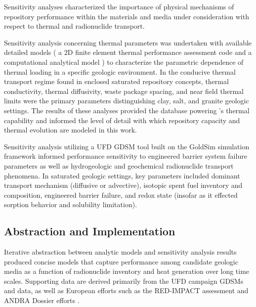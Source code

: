 Sensitivity analyses characterized the importance of physical mechanisms of 
repository performance  within the materials and media under consideration with 
respect to thermal and radionuclide transport.

Sensitivity analysis concerning thermal parameters was undertaken with available 
detailed models ( a 2D finite element thermal performance assessment code 
\cite{huff_benchmarking_2012, huff_numerical_2012} and a computational analytical model 
\cite{greenberg_application_2012}) to characterize the parametric dependence of 
thermal loading in a specific geologic environment.  In the conducive thermal 
transport regime found in enclosed saturated repository concepts, thermal 
conductivity, thermal diffusivity, waste package spacing, and near field thermal 
limits were the primary parameters distinguishing clay, salt, and granite 
geologic settings. The results of these analyses provided the database powering 
\Cyder's thermal capability and informed the level of detail with which 
repository capacity and thermal evolution are modeled in this work.  

Sensitivity analysis utilizing a \gls{UFD} \gls{GDSM} tool built on the 
GoldSim simulation framework informed performance sensitivity to engineered 
barrier system failure parameters as well as hydrogeologic and geochemical 
radionuclide transport phenomena. In saturated geologic settings, key parameters 
included dominant transport mechanism (diffusive or 
advective), isotopic spent fuel inventory and composition, engineered barrier 
failure, and redox state (insofar as it effected sorption behavior and 
solubility limitation).

\subsection{Abstraction and Implementation}


Iterative abstraction between analytic models and sensitivity analysis results 
produced concise models that capture performance among candidate geologic media 
as a function of radionuclide inventory and heat generation over long time 
scales. Supporting data are derived primarily from the \gls{UFD} campaign 
\glspl{GDSM} and data, as well as European efforts such as the RED-IMPACT 
assessment and \gls{ANDRA} Dossier efforts \cite{von_lensa_red-impact_2008, 
andra_argile:_2005, clayton_generic_2011} . 


